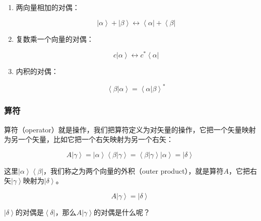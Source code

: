 \begin{enumerate}
\item 

两向量相加的对偶：

\begin{equation}
\left| \alpha \right\rangle + \left| \beta \right\rangle  \leftrightarrow \left\langle \alpha \right| + \left\langle \beta \right|~
\end{equation}

\item

复数乘一个向量的对偶：

\begin{equation}
c \left| \alpha \right\rangle  \leftrightarrow c^* \left\langle \alpha \right|~
\end{equation}

\item

内积的对偶：

\begin{equation}
\left\langle \beta | \alpha \right\rangle = \left\langle \alpha | \beta \right\rangle^*~
\end{equation}

\end{enumerate}

\subsubsection{算符}

算符（operator）就是操作，我们把算符定义为对矢量的操作，它把一个矢量映射为另一个矢量，比如它把一个右矢映射为另一个右矢：

\begin{equation}
A \left| \gamma \right\rangle = \left| \alpha \right\rangle \left\langle \beta |  \gamma \right\rangle =  \left\langle \beta |  \gamma \right\rangle  \left| \alpha \right\rangle = \left| \delta \right\rangle~
\end{equation}

这里$ \left| \alpha \right\rangle \left\langle \beta \right| $，我们称之为两个向量的外积（outer product），就是算符$A$，它把右矢$\left|  \gamma \right\rangle$映射为$\left| \delta \right\rangle$。

\begin{equation}
A \left| \gamma \right\rangle = \left| \delta \right\rangle~
\end{equation}

$\left| \delta \right\rangle$的对偶是$\left\langle  \delta \right|$，那么$A \left| \gamma \right\rangle$的对偶是什么呢？

